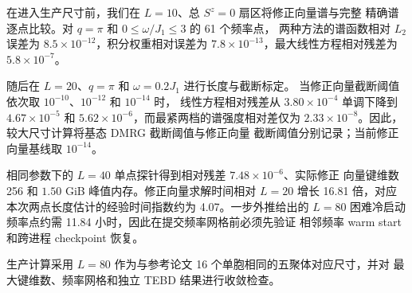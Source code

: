 在进入生产尺寸前，我们在 $L=10$、总 $S^z=0$ 扇区将修正向量谱与完整
精确谱逐点比较。对 $q=\pi$ 和 $0\leq\omega/J_1\leq3$ 的 61 个频率点，
两种方法的谱函数相对 $L_2$ 误差为 $8.5\times10^{-12}$，积分权重相对误差为
$7.8\times10^{-13}$，最大线性方程相对残差为 $5.8\times10^{-7}$。

随后在 $L=20$、$q=\pi$ 和 $\omega=0.2J_1$ 进行长度与截断标定。
当修正向量截断阈值依次取 $10^{-10}$、$10^{-12}$ 和 $10^{-14}$ 时，
线性方程相对残差从 $3.80\times10^{-4}$ 单调下降到
$4.67\times10^{-5}$ 和 $5.62\times10^{-6}$，而最紧两档的谱强度相对差仅为
$2.33\times10^{-8}$。因此，较大尺寸计算将基态 DMRG 截断阈值与修正向量
截断阈值分别记录；当前修正向量基线取 $10^{-14}$。

相同参数下的 $L=40$ 单点探针得到相对残差 $7.48\times10^{-6}$、实际修正
向量键维数 256 和 $1.50$ GiB 峰值内存。修正向量求解时间相对 $L=20$ 增长
16.81 倍，对应本次两点长度估计的经验时间指数约为 4.07。一步外推给出的
$L=80$ 困难冷启动频率点约需 11.84 小时，因此在提交频率网格前必须先验证
相邻频率 warm start 和跨进程 checkpoint 恢复。

生产计算采用 $L=80$ 作为与参考论文 16 个单胞相同的五聚体对应尺寸，并对
最大键维数、频率网格和独立 TEBD 结果进行收敛检查。
